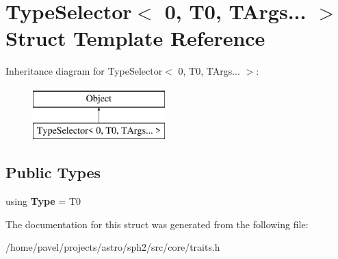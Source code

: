 \hypertarget{structTypeSelector_3_010_00_01T0_00_01TArgs_8_8_8_01_4}{}\section{Type\+Selector$<$ 0, T0, T\+Args... $>$ Struct Template Reference}
\label{structTypeSelector_3_010_00_01T0_00_01TArgs_8_8_8_01_4}
Inheritance diagram for Type\+Selector$<$ 0, T0, T\+Args... $>$\+:\begin{figure}[H]
\begin{center}
\leavevmode
\includegraphics[height=2.000000cm]{structTypeSelector_3_010_00_01T0_00_01TArgs_8_8_8_01_4}
\end{center}
\end{figure}
\subsection*{Public Types}
\begin{DoxyCompactItemize}
\item 
\hypertarget{structTypeSelector_3_010_00_01T0_00_01TArgs_8_8_8_01_4_a9b70fcf60e3ebb76b3d634f7dd0ba513}{}\label{structTypeSelector_3_010_00_01T0_00_01TArgs_8_8_8_01_4_a9b70fcf60e3ebb76b3d634f7dd0ba513} 
using {\bfseries Type} = T0
\end{DoxyCompactItemize}


The documentation for this struct was generated from the following file\+:\begin{DoxyCompactItemize}
\item 
/home/pavel/projects/astro/sph2/src/core/traits.\+h\end{DoxyCompactItemize}
